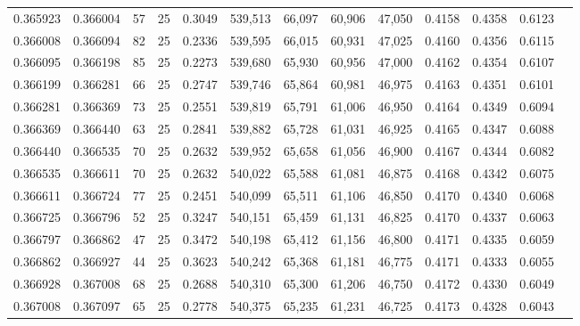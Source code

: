 \begin{tabular}{rrrrrrrrrrrrr}
0.365923 & 0.366004 &    57 &  25 &                                     0.3049 & 539,513 &  66,097 &  60,906 &  47,050 & 0.4158 & 0.4358 & 0.6123 \\
0.366008 & 0.366094 &    82 &  25 &                                     0.2336 & 539,595 &  66,015 &  60,931 &  47,025 & 0.4160 & 0.4356 & 0.6115 \\
0.366095 & 0.366198 &    85 &  25 &                                     0.2273 & 539,680 &  65,930 &  60,956 &  47,000 & 0.4162 & 0.4354 & 0.6107 \\
0.366199 & 0.366281 &    66 &  25 &                                     0.2747 & 539,746 &  65,864 &  60,981 &  46,975 & 0.4163 & 0.4351 & 0.6101 \\
0.366281 & 0.366369 &    73 &  25 &                                     0.2551 & 539,819 &  65,791 &  61,006 &  46,950 & 0.4164 & 0.4349 & 0.6094 \\
0.366369 & 0.366440 &    63 &  25 &                                     0.2841 & 539,882 &  65,728 &  61,031 &  46,925 & 0.4165 & 0.4347 & 0.6088 \\
0.366440 & 0.366535 &    70 &  25 &                                     0.2632 & 539,952 &  65,658 &  61,056 &  46,900 & 0.4167 & 0.4344 & 0.6082 \\
0.366535 & 0.366611 &    70 &  25 &                                     0.2632 & 540,022 &  65,588 &  61,081 &  46,875 & 0.4168 & 0.4342 & 0.6075 \\
0.366611 & 0.366724 &    77 &  25 &                                     0.2451 & 540,099 &  65,511 &  61,106 &  46,850 & 0.4170 & 0.4340 & 0.6068 \\
0.366725 & 0.366796 &    52 &  25 &                                     0.3247 & 540,151 &  65,459 &  61,131 &  46,825 & 0.4170 & 0.4337 & 0.6063 \\
0.366797 & 0.366862 &    47 &  25 &                                     0.3472 & 540,198 &  65,412 &  61,156 &  46,800 & 0.4171 & 0.4335 & 0.6059 \\
0.366862 & 0.366927 &    44 &  25 &                                     0.3623 & 540,242 &  65,368 &  61,181 &  46,775 & 0.4171 & 0.4333 & 0.6055 \\
0.366928 & 0.367008 &    68 &  25 &                                     0.2688 & 540,310 &  65,300 &  61,206 &  46,750 & 0.4172 & 0.4330 & 0.6049 \\
0.367008 & 0.367097 &    65 &  25 &                                     0.2778 & 540,375 &  65,235 &  61,231 &  46,725 & 0.4173 & 0.4328 & 0.6043 \\

\end{tabular}
